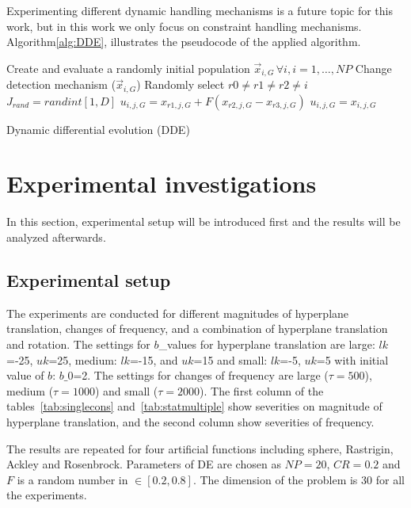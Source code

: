 \documentclass[conference]{IEEEtran}
\begin{document}
Experimenting different dynamic handling mechanisms is a future topic for this work, but in this work we only focus on constraint handling mechanisms. Algorithm\ref{alg:DDE}, illustrates the pseudocode of the applied algorithm.

\begin{algorithm}[t]
\small
\begin{algorithmic}[1]
	 \STATE Create and evaluate a randomly initial population $\vec{x}_{i,G}\,\forall i, i=1, \ldots, NP$
				\STATE Change detection mechanism ($\vec{x}_{i,G}$)				
				\STATE Randomly select $r0 \neq r1 \neq r2 \neq i$
				\STATE $J_{rand} = randint [1,D]$
						\STATE $u_{i,j,G} = x_{r1,j,G} + F(x_{r2,j,G} - x_{r3,j,G}) $
					\ELSE
						\STATE $u_{i,j,G} = x_{i,j,G}$
					\ENDIF
				\ENDFOR
			\ENDFOR
		\ENDFOR
\end{algorithmic}
\caption{Dynamic differential evolution (DDE)}
\label{alg:DDE}
\vspace{.1cm}
\end{algorithm}

\section{Experimental investigations}
In this section, experimental setup will be introduced first and the results will be analyzed afterwards.
\label{sec:Experiment}
\subsection{Experimental setup}
\label{subsec:exp-setup}
The experiments are conducted for different magnitudes of hyperplane translation, changes of frequency, and a combination of hyperplane translation and rotation. The settings for $b$\_values for hyperplane translation are large: $lk$=-25, $uk$=25, medium: $lk$=-15, and $uk$=15 and small: $lk$=-5, $uk$=5 with initial value of $b$: $b\_0$=2. The settings for changes of frequency are large ($\tau=500$), medium ($\tau=1000$) and small ($\tau=2000$).
The first column of the tables~\ref{tab:singlecons} and~\ref{tab:statmultiple} show severities on magnitude of hyperplane translation, and the second column show severities of frequency.

The results are repeated for four artificial functions including sphere, Rastrigin, Ackley and Rosenbrock. 
Parameters of DE are chosen as $NP=20$, $CR=0.2$ and $F$ is a random number in $\in[0.2,0.8]$. The dimension of the problem is 30 for all the experiments. 
\end{document}
